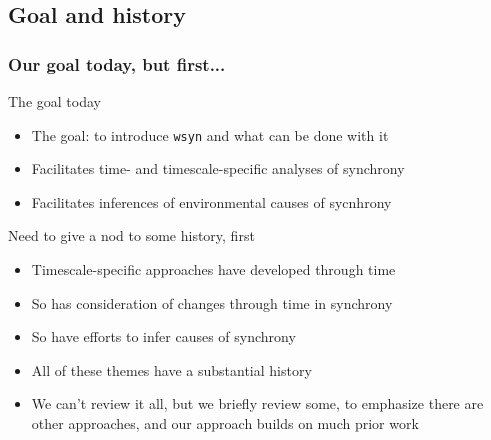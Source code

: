 \documentclass{beamer}
\begin{document}
\subsection{Goal and history}

\begin{frame}
\frametitle{Our goal today, but first...}
\begin{block}{The goal today}
\begin{itemize}
\item The goal: to introduce \texttt{wsyn} and what can be done with it
\item Facilitates time- and timescale-specific analyses of synchrony
\item Facilitates inferences of environmental causes of sycnhrony 
\end{itemize}
\end{block}
\begin{block}{Need to give a nod to some history, first}
\begin{itemize}
\item Timescale-specific approaches have developed through time
\item So has consideration of changes through time in synchrony
\item So have efforts to infer causes of synchrony
\item All of these themes have a substantial history
\item We can't review it all, but we briefly review some, to emphasize there are other approaches, and our approach builds on much prior work
\end{itemize}
\end{block}
\end{frame}
\end{document}
